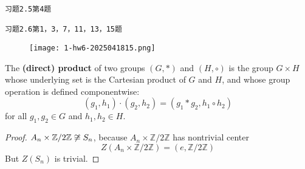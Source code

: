 \begin{lstlisting}
习题2.5第4题

习题2.6第1，3，7，11，13，15题
\end{lstlisting}
\begin{exercise}
\begin{figure}[H]
\centering
\texttt{[image: 1-hw6-2025041815.png]}
\label{}
\end{figure}
\end{exercise}
\begin{definition}
The \textbf{(direct) product} of two groups $(G, *)$ and $(H, \circ)$ is the group $G \times H$ whose underlying set is the Cartesian product of $G$ and $H$, and whose group operation is defined componentwise:
\[
\left(g_1, h_1\right) \cdot\left(g_2, h_2\right)=\left(g_1 * g_2, h_1 \circ h_2\right)
\]for all $g_1, g_2 \in G$ and $h_1, h_2 \in H$.
\end{definition}
\begin{proof}
$A_n\times \mathbb{Z}/2\mathbb{Z}\centernot{\cong}S_n$, because $A_n\times \mathbb{Z}/2\mathbb{Z}$ has nontrivial center
\[
Z(A_n\times \mathbb{Z}/2\mathbb{Z})=(e,\mathbb{Z}/2\mathbb{Z})
\]
But $Z(S_n)$ is trivial.
\end{proof}

